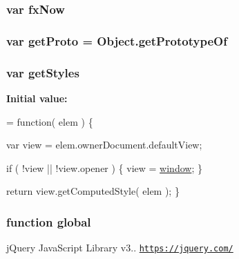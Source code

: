 \subsubsection[{\texorpdfstring{fx\+Now}{fxNow}}]{\setlength{\rightskip}{0pt plus 5cm}var fx\+Now}\hypertarget{jquery-3_82_81_8js_a008b3271e2f410e89917bc6d96096296}{}\label{jquery-3_82_81_8js_a008b3271e2f410e89917bc6d96096296}
\subsubsection[{\texorpdfstring{get\+Proto}{getProto}}]{\setlength{\rightskip}{0pt plus 5cm}var get\+Proto = Object.\+get\+Prototype\+Of}\hypertarget{jquery-3_82_81_8js_a8cfba932e510c58e75654c8bf0c22e8a}{}\label{jquery-3_82_81_8js_a8cfba932e510c58e75654c8bf0c22e8a}
\subsubsection[{\texorpdfstring{get\+Styles}{getStyles}}]{\setlength{\rightskip}{0pt plus 5cm}var get\+Styles}\hypertarget{jquery-3_82_81_8js_a9808a091e9293061932eaa058211dedd}{}\label{jquery-3_82_81_8js_a9808a091e9293061932eaa058211dedd}
{\bfseries Initial value\+:}
\begin{DoxyCode}
= \textcolor{keyword}{function}( elem ) \{

        
        
        
        var view = elem.ownerDocument.defaultView;

        \textcolor{keywordflow}{if} ( !view || !view.opener ) \{
            view = \hyperlink{jquery-3_82_81_8js_ad55530ae1e5978df8e721017c1fc8466}{window};
        \}

        \textcolor{keywordflow}{return} view.getComputedStyle( elem );
    \}
\end{DoxyCode}
\subsubsection[{\texorpdfstring{global}{global}}]{\setlength{\rightskip}{0pt plus 5cm}function global}\hypertarget{jquery-3_82_81_8js_a57efe929cc6b44042891d05e15cec785}{}\label{jquery-3_82_81_8js_a57efe929cc6b44042891d05e15cec785}
j\+Query Java\+Script Library v3.. \href{https://jquery.com/}{\tt https\+://jquery.\+com/}

